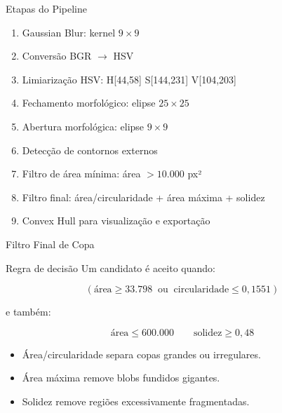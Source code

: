 \documentclass[aspectratio=169, 11pt]{beamer}
\begin{document}
\begin{frame}{Etapas do Pipeline}
    \begin{enumerate}
        \item Gaussian Blur: kernel $9 \times 9$
        \item Conversão BGR $\rightarrow$ HSV
        \item Limiarização HSV: H[44,58] S[144,231] V[104,203]
        \item Fechamento morfológico: elipse $25 \times 25$
        \item Abertura morfológica: elipse $9 \times 9$
        \item Detecção de contornos externos
        \item Filtro de área mínima: área $> 10.000$ px²
        \item Filtro final: área/circularidade + área máxima + solidez
        \item Convex Hull para visualização e exportação
    \end{enumerate}
\end{frame}

\begin{frame}{Filtro Final de Copa}
    \begin{block}{Regra de decisão}
    Um candidato é aceito quando:

    \[
        (\text{área} \geq 33.798 \;\; \text{ou} \;\; \text{circularidade} \leq 0{,}1551)
    \]

    e também:

    \[
        \text{área} \leq 600.000
        \qquad
        \text{solidez} \geq 0{,}48
    \]
    \end{block}

    \begin{itemize}
        \item Área/circularidade separa copas grandes ou irregulares.
        \item Área máxima remove blobs fundidos gigantes.
        \item Solidez remove regiões excessivamente fragmentadas.
    \end{itemize}
\end{frame}
\end{document}
